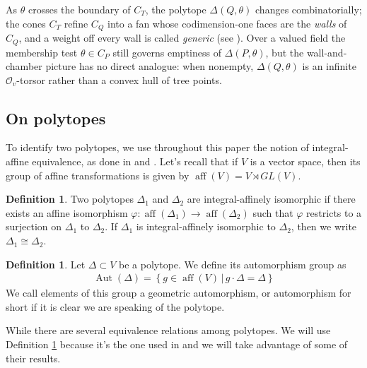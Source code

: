 \documentclass[12pt]{amsart}
\theoremstyle{plain}
\theoremstyle{definition}
\newtheorem{definition}[theorem]{Definition}
\DeclareMathOperator{\aut}{Aut}
\DeclareMathOperator{\aff}{aff}
\begin{document}
As $\theta$ crosses the boundary of $C_T$, the polytope $\Delta(Q, \theta)$ changes combinatorially; the cones $C_T$ refine $C_Q$ into a fan whose codimension-one faces are the \emph{walls} of $C_Q$, and a weight off every wall is called \emph{generic} (see \cite{hille2003quivers}). Over a valued field the membership test $\theta \in C_P$ still governs emptiness of $\Delta(P, \theta)$, but the wall-and-chamber picture has no direct analogue: when nonempty, $\Delta(Q, \theta)$ is an infinite $\mathcal{O}_v$-torsor rather than a convex hull of tree points.


\subsection{On polytopes}
To identify two polytopes, we use throughout this paper the notion of integral-affine equivalence, as done in \cite{domokos2016equations} and \cite{bruns2000semigroup}. Let's recall that if $V$ is a vector space, then its group of affine transformations is given by 
$\aff(V) = V \rtimes GL(V)$.
\begin{definition}
    Two polytopes $\Delta_1$ and $\Delta_2$ are integral-affinely isomorphic if there exists an affine isomorphism $\varphi : \aff(\Delta_1) \longrightarrow \aff(\Delta_2)$ such that $\varphi$ restricts to a surjection on $\Delta_1$ to $\Delta_2$. If $\Delta_1$ is integral-affinely isomorphic to $\Delta_2$, then we write $\Delta_1 \cong \Delta_2$.
\end{definition}



\begin{definition}
\label{def:auto_polytope}
Let $\Delta \subset V$ be a polytope. We define its automorphism group as 
\begin{align*}
    \aut(\Delta) = \left\{
g \in \aff(V) \, | \, 
g\cdot \Delta = \Delta
    \right\}
\end{align*}
 We call elements of this group a geometric automorphism, or automorphism for short if it is clear we are speaking of the polytope.  
\end{definition}
While there are several equivalence relations among polytopes. We will use Definition \ref{def:auto_polytope} because it's the one used in \cite{domokos2016equations} and we will take advantage of some of their results. 
\end{document}
